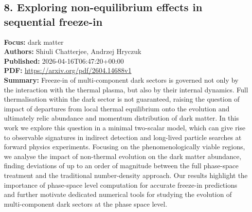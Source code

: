 \documentclass[11pt]{article}
\begin{document}
\subsection*{8. Exploring non-equilibrium effects in sequential freeze-in}
\textbf{Focus:} dark matter\\
\textbf{Authors:} Shiuli Chatterjee, Andrzej Hryczuk\\
\textbf{Published:} 2026-04-16T06:47:20+00:00\\
\textbf{PDF:} \href{https://arxiv.org/pdf/2604.14688v1}{https://arxiv.org/pdf/2604.14688v1}\\
\textbf{Summary:}
Freeze-in of multi-component dark sectors is governed not only by the interaction with the thermal plasma, but also by their internal dynamics. Full thermalisation within the dark sector is not guaranteed, raising the question of impact of departures from local thermal equilibrium onto the evolution and ultimately relic abundance and momentum distribution of dark matter. In this work we explore this question in a minimal two-scalar model, which can give rise to observable signatures in indirect detection and long-lived particle searches at forward physics experiments. Focusing on the phenomenologically viable regions, we analyse the impact of non-thermal evolution on the dark matter abundance, finding deviations of up to an order of magnitude between the full phase-space treatment and the traditional number-density approach. Our results highlight the importance of phase-space level computation for accurate freeze-in predictions and further motivate dedicated numerical tools for studying the evolution of multi-component dark sectors at the phase space level.
\newpage
\end{document}
